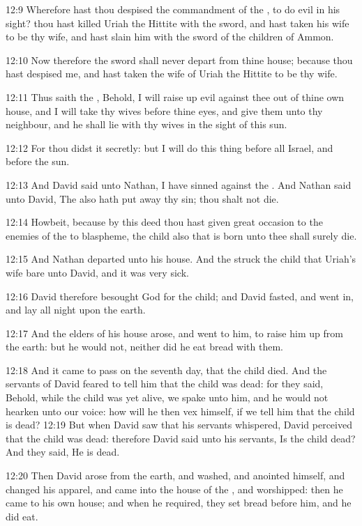 12:9 Wherefore hast thou despised the commandment of the \LORD, to do
evil in his sight? thou hast killed Uriah the Hittite with the sword,
and hast taken his wife to be thy wife, and hast slain him with the
sword of the children of Ammon.

12:10 Now therefore the sword shall never depart from thine house;
because thou hast despised me, and hast taken the wife of Uriah the
Hittite to be thy wife.

12:11 Thus saith the \LORD, Behold, I will raise up evil against thee
out of thine own house, and I will take thy wives before thine eyes,
and give them unto thy neighbour, and he shall lie with thy wives in
the sight of this sun.

12:12 For thou didst it secretly: but I will do this thing before all
Israel, and before the sun.

12:13 And David said unto Nathan, I have sinned against the \LORD. And
Nathan said unto David, The \LORD also hath put away thy sin; thou
shalt not die.

12:14 Howbeit, because by this deed thou hast given great occasion to
the enemies of the \LORD to blaspheme, the child also that is born unto
thee shall surely die.

12:15 And Nathan departed unto his house. And the \LORD struck the
child that Uriah's wife bare unto David, and it was very sick.

12:16 David therefore besought God for the child; and David fasted,
and went in, and lay all night upon the earth.

12:17 And the elders of his house arose, and went to him, to raise him
up from the earth: but he would not, neither did he eat bread with
them.

12:18 And it came to pass on the seventh day, that the child died. And
the servants of David feared to tell him that the child was dead: for
they said, Behold, while the child was yet alive, we spake unto him,
and he would not hearken unto our voice: how will he then vex himself,
if we tell him that the child is dead?  12:19 But when David saw that
his servants whispered, David perceived that the child was dead:
therefore David said unto his servants, Is the child dead? And they
said, He is dead.

12:20 Then David arose from the earth, and washed, and anointed
himself, and changed his apparel, and came into the house of the \LORD,
and worshipped: then he came to his own house; and when he required,
they set bread before him, and he did eat.

